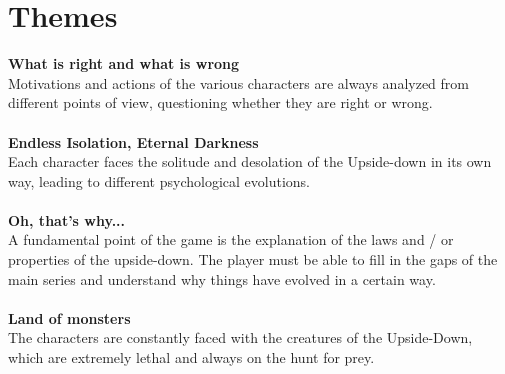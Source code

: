 \section{Themes}
\textbf{What is right and what is wrong}\\
Motivations and actions of the various characters are always analyzed from different points of view, questioning whether they are right or wrong.\\\\
\textbf{Endless Isolation, Eternal Darkness}\\
Each character faces the solitude and desolation of the Upside-down in its own way, leading to different psychological evolutions.\\\\
\textbf{Oh, that's why...}\\
A fundamental point of the game is the explanation of the laws and / or properties of the upside-down. The player must be able to fill in the gaps of the main series and understand why things have evolved in a certain way.\\\\
\textbf{Land of monsters}\\
The characters are constantly faced with the creatures of the Upside-Down, which are extremely lethal and always on the hunt for prey.
